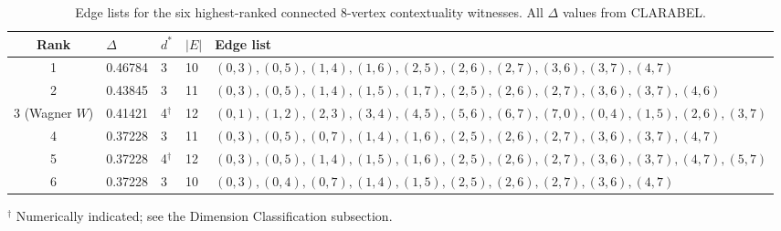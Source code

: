 \documentclass[aps,pra,twocolumn,superscriptaddress,longbibliography,floatfix]{revtex4-2}
\newcommand{\De}{\Delta}
\begin{document}
\begin{table}[!t]
  \caption{Edge lists for the six highest-ranked connected 8-vertex
           contextuality witnesses.  All $\De$ values from CLARABEL.}
  \label{tab:edgelists}
  \begin{ruledtabular}
  \scriptsize
  \begin{tabular}{cllll}
    Rank & $\De$ & $d^*$ & $|E|$ & Edge list \\
    \hline
    1 & 0.46784 & 3 & 10 &
      $(0,3),(0,5),(1,4),(1,6),(2,5),(2,6),(2,7),(3,6),(3,7),(4,7)$ \\
    2 & 0.43845 & 3 & 11 &
      $(0,3),(0,5),(1,4),(1,5),(1,7),(2,5),(2,6),(2,7),(3,6),(3,7),(4,6)$ \\
    3 (Wagner $W$) & 0.41421 & 4$^\dagger$ & 12 &
      $(0,1),(1,2),(2,3),(3,4),(4,5),(5,6),(6,7),(7,0),(0,4),(1,5),(2,6),(3,7)$ \\
    4 & 0.37228 & 3 & 11 &
      $(0,3),(0,5),(0,7),(1,4),(1,6),(2,5),(2,6),(2,7),(3,6),(3,7),(4,7)$ \\
    5 & 0.37228 & 4$^\dagger$ & 12 &
      $(0,3),(0,5),(1,4),(1,5),(1,6),(2,5),(2,6),(2,7),(3,6),(3,7),(4,7),(5,7)$ \\
    6 & 0.37228 & 3 & 10 &
      $(0,3),(0,4),(0,7),(1,4),(1,5),(2,5),(2,6),(2,7),(3,6),(4,7)$ \\
  \end{tabular}
  \end{ruledtabular}
  \noindent $^\dagger$ Numerically indicated; see the Dimension Classification subsection.
\end{table}
\end{document}
